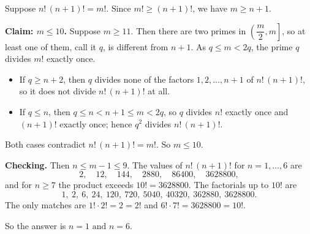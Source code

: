 Suppose $n!\,(n+1)!=m!$. Since $m!\ge(n+1)!$, we have $m\ge n+1$.

\textbf{Claim: $m\le10$.} Suppose $m\ge11$. Then there are two primes in $\left(\dfrac {m}{2},m\right]$, so at least one of them, call it $q$, is different from $n+1$. As $q\le m<2q$, the prime $q$ divides $m!$ exactly once.
\begin{itemize}
\item If $q\ge n+2$, then $q$ divides none of the factors $1,2,\dots,n+1$ of $n!\,(n+1)!$, so it does not divide $n!\,(n+1)!$ at all.
\item If $q\le n$, then $q\le n<n+1\le m<2q$, so $q$ divides $n!$ exactly once and $(n+1)!$ exactly once; hence $q^2$ divides $n!\,(n+1)!$.
\end{itemize}
Both cases contradict $n!\,(n+1)!=m!$. So $m\le10$.

\textbf{Checking.} Then $n\le m-1\le9$. The values of $n!\,(n+1)!$ for $n=1,\dots,6$ are
\[
2,\quad12,\quad144,\quad2880,\quad86400,\quad3628800,
\]
and for $n\ge7$ the product exceeds $10!=3628800$. The factorials up to $10!$ are
\[
1,\ 2,\ 6,\ 24,\ 120,\ 720,\ 5040,\ 40320,\ 362880,\ 3628800 .
\]
The only matches are $1!\cdot2!=2=2!$ and $6!\cdot7!=3628800=10!$.

So the answer is $\boxed{n=1\text{ and }n=6}$.
